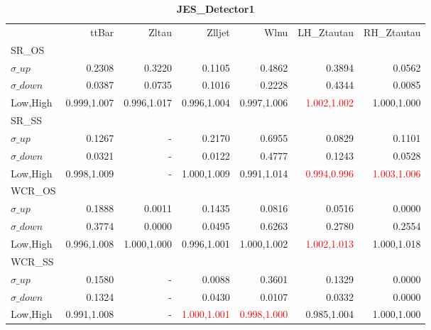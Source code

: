 \documentclass[11pt,oneside,a4paper]{article}
\begin{document}
\begin{table}
\caption{\bf{JES\_Detector1}}
\centering
\begin{tabular}{lrrrrrr}
& ttBar & Zltau & Zlljet & Wlnu & LH\_Ztautau & RH\_Ztautau \\

SR\_OS &  &  &  &  &  &  \\
$\sigma\_up$ & 0.2308 & 0.3220 & 0.1105 & 0.4862 & 0.3894 & 0.0562 \\
$\sigma\_down$ & 0.0387 & 0.0735 & 0.1016 & 0.2228 & 0.4344 & 0.0085 \\
Low,High & 0.999,1.007 & 0.996,1.017 & 0.996,1.004 & 0.997,1.006 & \textcolor{red}{1.002,1.002} & 1.000,1.000 \\

\hline
SR\_SS &  &  &  &  &  &  \\
$\sigma\_up$ & 0.1267 & - & 0.2170 & 0.6955 & 0.0829 & 0.1101 \\
$\sigma\_down$ & 0.0321 & - & 0.0122 & 0.4777 & 0.1243 & 0.0528 \\
Low,High & 0.998,1.009 & - & 1.000,1.009 & 0.991,1.014 & \textcolor{red}{0.994,0.996} & \textcolor{red}{1.003,1.006} \\

\hline
WCR\_OS &  &  &  &  &  &  \\
$\sigma\_up$ & 0.1888 & 0.0011 & 0.1435 & 0.0816 & 0.0516 & 0.0000 \\
$\sigma\_down$ & 0.3774 & 0.0000 & 0.0495 & 0.6263 & 0.2780 & 0.2554 \\
Low,High & 0.996,1.008 & 1.000,1.000 & 0.996,1.001 & 1.000,1.002 & \textcolor{red}{1.002,1.013} & 1.000,1.018 \\

\hline
WCR\_SS &  &  &  &  &  &  \\
$\sigma\_up$ & 0.1580 & - & 0.0088 & 0.3601 & 0.1329 & 0.0000 \\
$\sigma\_down$ & 0.1324 & - & 0.0430 & 0.0107 & 0.0332 & 0.0000 \\
Low,High & 0.991,1.008 & - & \textcolor{red}{1.000,1.001} & \textcolor{red}{0.998,1.000} & 0.985,1.004 & 1.000,1.000 \\

\end{tabular}
\end{table}
\end{document}
